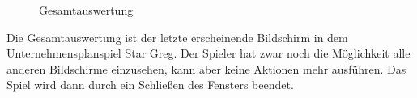 \begin{figure}[htb]
  \centering
  \caption{Gesamtauswertung}
  \label{img:ui-gesamtauswertung}
\end{figure}
 
Die Gesamtauswertung ist der letzte erscheinende Bildschirm in dem Unternehmensplanspiel Star Greg.  Der Spieler hat zwar noch die Möglichkeit alle anderen Bildschirme einzusehen, kann aber keine Aktionen mehr ausführen. Das Spiel wird dann durch ein Schließen des Fensters beendet. 



\autorende{}